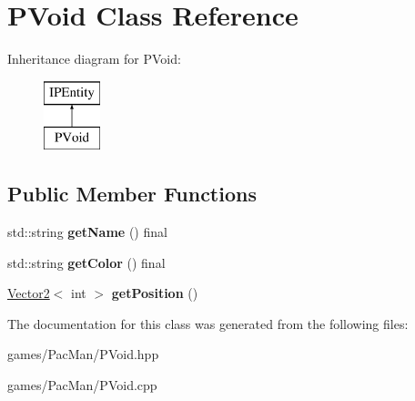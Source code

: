 \hypertarget{class_p_void}{}\section{P\+Void Class Reference}
\label{class_p_void}
Inheritance diagram for P\+Void\+:\begin{figure}[H]
\begin{center}
\leavevmode
\includegraphics[height=2.000000cm]{class_p_void}
\end{center}
\end{figure}
\subsection*{Public Member Functions}
\begin{DoxyCompactItemize}
\item 
\mbox{\label{class_p_void_aca093f464068d1c4a0d15998f3d9f716}} 
std\+::string {\bfseries get\+Name} () final
\item 
\mbox{\label{class_p_void_a7ce40aadd2847d9ff110fe5103a1c53d}} 
std\+::string {\bfseries get\+Color} () final
\item 
\mbox{\label{class_p_void_aa887ea58e955bee9ff19328d75109776}} 
\hyperlink{struct_vector2}{Vector2}$<$ int $>$ {\bfseries get\+Position} ()
\end{DoxyCompactItemize}


The documentation for this class was generated from the following files\+:\begin{DoxyCompactItemize}
\item 
games/\+Pac\+Man/P\+Void.\+hpp\item 
games/\+Pac\+Man/P\+Void.\+cpp\end{DoxyCompactItemize}
